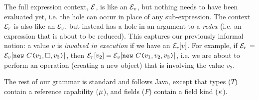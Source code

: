 The full expression context, $\mathcal{E}$, is like an $\mathcal{E}_v{}$, but nothing needs to have been evaluated yet, i.e. the hole can occur in place of any sub-expression.
The context $\mathcal{E}_r{}$ is also like an $\mathcal{E}_v{}$, but instead has a hole in an argument to a \emph{redex} (i.e. an expression that is about to be reduced).
	This captures our previously informal notion: a value $v$ is \emph{involved in execution} if we have an $\mathcal{E}_r{}[v]$.
	For example, if $\mathcal{E}_r{}$ = $\mathcal{E}_v{}[\texttt{new}\ C\texttt{(} v_1,\square,v_3\texttt{)}]$, then $\mathcal{E}_r{}[v_2] = \mathcal{E}_v{}[\texttt{new}\ C\texttt{(} v_1,v_2,v_3\texttt{)}]$, i.e. we are about to perform an operation (creating a new object) that is involving the value $v_2$.



The rest of our grammar is standard and follows Java, except that types ($T$) contain a reference capability ($\mu$), and fields ($F$) contain a field kind ($\kappa$).

